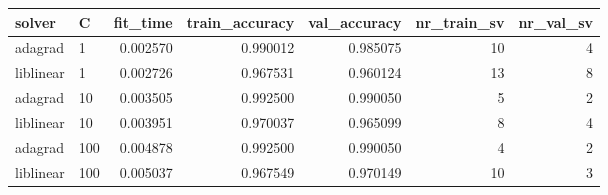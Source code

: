 \begin{tabular}{llrrrrr}
\toprule
   solver &   C &  fit\_time &  train\_accuracy &  val\_accuracy &  nr\_train\_sv &  nr\_val\_sv \\
\midrule
  adagrad &   1 &  0.002570 &        0.990012 &      0.985075 &           10 &          4 \\
liblinear &   1 &  0.002726 &        0.967531 &      0.960124 &           13 &          8 \\
  adagrad &  10 &  0.003505 &        0.992500 &      0.990050 &            5 &          2 \\
liblinear &  10 &  0.003951 &        0.970037 &      0.965099 &            8 &          4 \\
  adagrad & 100 &  0.004878 &        0.992500 &      0.990050 &            4 &          2 \\
liblinear & 100 &  0.005037 &        0.967549 &      0.970149 &           10 &          3 \\
\bottomrule
\end{tabular}
